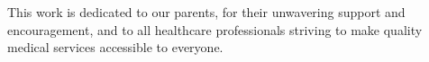 This work is dedicated to our parents, for their unwavering support and encouragement, and to all healthcare professionals striving to make quality medical services accessible to everyone.

